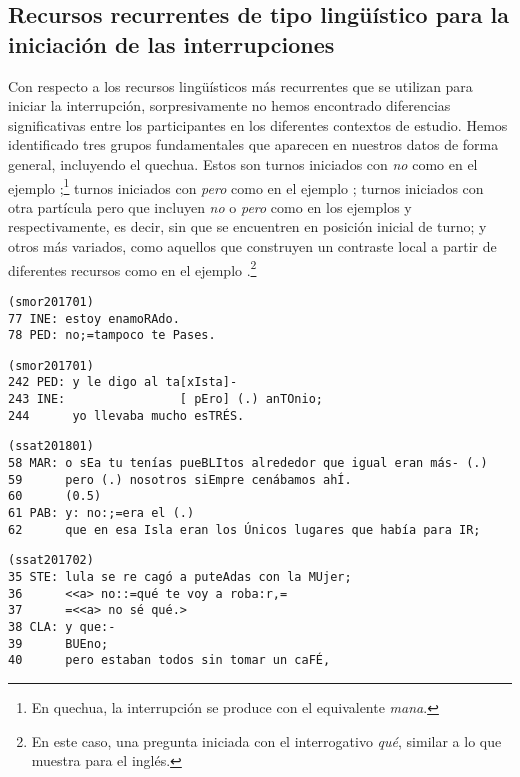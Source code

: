 \documentclass[output=paper]{../langscibook}
\begin{document}
\subsection{Recursos recurrentes de tipo lingüístico para la iniciación de las interrupciones}\label{sec:satti:3.1}
\largerpage
Con respecto a los recursos lingüísticos más recurrentes que se utilizan para iniciar la interrupción, sorpresivamente no hemos encontrado diferencias significativas entre los participantes en los diferentes contextos de estudio. Hemos identificado tres grupos fundamentales que aparecen en nuestros datos de forma general, incluyendo el quechua. Estos son turnos iniciados con \textit{no} como en el ejemplo ;\footnote{En quechua, la interrupción se produce con el equivalente \textit{mana}.} turnos iniciados con \textit{pero} como en el ejemplo  ; turnos iniciados con otra partícula pero que incluyen \textit{no} o \textit{pero} como en los ejemplos  y  respectivamente, es decir, sin que se encuentren en posición inicial de turno; y otros más variados, como aquellos que construyen un contraste local a partir de diferentes recursos como en el ejemplo .\footnote{En este caso, una pregunta iniciada con el interrogativo \textit{qué}, similar a lo que muestra \citet{Koshik2003} para el inglés.}


\ea\label{ex:satti:2}
\begin{verbatim}
(smor201701)
77 INE: estoy enamoRAdo.
78 PED: no;=tampoco te Pases.
\end{verbatim}
\z

\ea\label{ex:satti:3}
\begin{verbatim}
(smor201701)
242 PED: y le digo al ta[xIsta]-
243 INE:                [ pEro] (.) anTOnio;
244      yo llevaba mucho esTRÉS.
\end{verbatim}
\z

\ea\label{ex:satti:4}
\begin{verbatim}
(ssat201801)
58 MAR: o sEa tu tenías pueBLItos alrededor que igual eran más- (.)
59      pero (.) nosotros siEmpre cenábamos ahÍ.
60      (0.5)
61 PAB: y: no:;=era el (.)
62      que en esa Isla eran los Únicos lugares que había para IR;
\end{verbatim}
\z

\ea\label{ex:satti:5}
\begin{verbatim}
(ssat201702)
35 STE: lula se re cagó a puteAdas con la MUjer;
36      <<a> no::=qué te voy a roba:r,=
37      =<<a> no sé qué.>
38 CLA: y que:-
39      BUEno;
40      pero estaban todos sin tomar un caFÉ,
\end{verbatim}
\z
\end{document}
